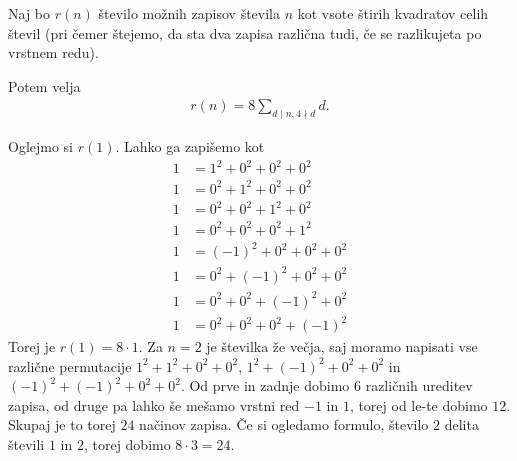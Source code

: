 \begin{izrek}
    \label{jacobi-four-squares}
    Naj bo \(r(n)\) število možnih zapisov števila \(n\) kot vsote štirih kvadratov celih števil (pri čemer štejemo, da sta dva zapisa različna tudi, če se razlikujeta po vrstnem redu).

    Potem velja
    \begin{align*}
        r(n) = 8\sum_{d\mid n, 4\nmid d} d.
    \end{align*}
\end{izrek}
\begin{primer}
    Oglejmo si \(r(1)\).
    Lahko ga zapišemo kot
    \begin{align*}
        1 &= 1^2 + 0^2 + 0^2 + 0^2    \\
        1 &= 0^2 + 1^2 + 0^2 + 0^2    \\
        1 &= 0^2 + 0^2 + 1^2 + 0^2    \\
        1 &= 0^2 + 0^2 + 0^2 + 1^2    \\
        1 &= (-1)^2 + 0^2 + 0^2 + 0^2 \\
        1 &= 0^2 + (-1)^2 + 0^2 + 0^2 \\
        1 &= 0^2 + 0^2 + (-1)^2 + 0^2 \\
        1 &= 0^2 + 0^2 + 0^2 + (-1)^2
    \end{align*}
    Torej je \(r(1) = 8 \cdot 1\). Za \(n=2\) je številka že večja, saj moramo napisati vse različne permutacije \(1^2 + 1^2+0^2+0^2\), \(1^2 + (-1)^2+0^2+0^2\) in \((-1)^2 + (-1)^2+0^2+0^2\). Od prve in zadnje dobimo \(6\) različnih ureditev zapisa, od druge pa lahko še mešamo vrstni red \(-1\) in \(1\), torej od le-te dobimo \(12\). Skupaj je to torej \(24\) načinov zapisa. Če si ogledamo formulo, število \(2\) delita števili \(1\) in \(2\), torej dobimo \(8\cdot 3 = 24\).
\end{primer}

